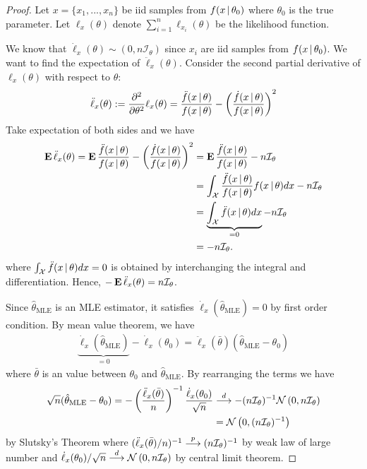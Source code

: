 \documentclass[11pt]{article}
\begin{document}
\begin{proof}
	Let $x=\{x_1,...,x_n\}$ be iid samples from $f(x\,|\,\theta_0)$ where
	$\theta_0$ is the true parameter.
	Let $\ell_{x}(\theta)$ denote $\sum_{i=1}^{n}\ell_{x_i}(\theta)$ be
	the likelihood function.

	We know that $\dot\ell_{x}(\theta)\sim(0,n\mathcal{I}_{\theta})$
	since $x_i$ are iid samples from $f(x\,|\,\theta_0)$.
	We want to find the expectation of $\ddot\ell_{x}(\theta)$.
	Consider the second partial derivative of $\ell_{x}(\theta)$
	with respect to $\theta$:
	\begin{align*}
		\ddot\ell_{x}(\theta)
		:= \frac{\partial^2}{\partial\theta^2} \ell_{x}(\theta)
		= \frac{\ddot f(x\,|\,\theta)}{f(x\,|\,\theta)}
		- \left(\frac{\dot f(x\,|\,\theta)}{f(x\,|\,\theta)}\right)^2
	\end{align*}
	Take expectation of both sides and we have
	\begin{align*}
		\operatorname{\text{\textrm{\upshape\textbf{E}}}}{\ddot\ell_{x}(\theta)}
		= \operatorname{\text{\textrm{\upshape\textbf{E}}}}{ \frac{\ddot f(x\,|\,\theta)}{f(x\,|\,\theta)}
		- \left(\frac{\dot f(x\,|\,\theta)}{f(x\,|\,\theta)}\right)^2 }
		&= \operatorname{\text{\textrm{\upshape\textbf{E}}}}{\frac{\ddot f(x\,|\,\theta)}{f(x\,|\,\theta)}}
		- n\mathcal{I}_{\theta} \\
		&= \int_{\mathcal{X}}
		\frac{\ddot f(x\,|\,\theta)}{f(x\,|\,\theta)}f(x\,|\,\theta) d{x}
		- n\mathcal{I}_{\theta} \\
		&= \underbrace{\int_{\mathcal{X}} \ddot f(x\,|\,\theta) d{x}}_{=0}
		- n\mathcal{I}_{\theta} \\
		&= - n\mathcal{I}_{\theta}.
	\end{align*}
	where $\int_{\mathcal{X}}\ddot f(x\,|\,\theta)d{x}=0$ is obtained by
	interchanging the integral and differentiation.
	Hence, $-\operatorname{\text{\textrm{\upshape\textbf{E}}}}{\ddot\ell_{x}(\theta)}=n\mathcal{I}_{\theta}$.

	Since $\hat{\theta}_{\text{MLE}}$ is an MLE estimator, 
	it satisfies $\dot\ell_{x}(\hat{\theta}_{\text{MLE}})=0$ by first order condition.
	By mean value theorem, we have
	\begin{align*}
		\underbrace{\dot\ell_{x}(\hat{\theta}_{\text{MLE}})}_{=0}
		- \dot\ell_{x}(\theta_0)
		= \ddot\ell_{x}(\bar\theta)(\hat{\theta}_{\text{MLE}}-\theta_0)
	\end{align*}
	where $\bar{\theta}$ is an value between $\theta_0$ and $\hat{\theta}_{\text{MLE}}$.
	By rearranging the terms we have
	\begin{align*}
		\sqrt{n}(\hat{\theta}_{\text{MLE}}-\theta_0)
		= -\left(\frac{\ddot\ell_{x}(\bar\theta)}{n}\right)^{-1}
		\frac{\dot\ell_{x}(\theta_0)}{\sqrt{n}}
		&\overset{d}{\longrightarrow} -(n\mathcal{I}_{\theta})^{-1}\mathcal{N}\left(0,n\mathcal{I}_{\theta}\right) \\
		&= \mathcal{N}\left(0,(n\mathcal{I}_{\theta})^{-1}\right)
	\end{align*}
	by Slutsky's Theorem
	where $({\ddot\ell_{x}(\bar\theta)}/{n})^{-1}\overset{p}{\longrightarrow}(n\mathcal{I}_{\theta})^{-1}$
	by weak law of large number and
	${\dot\ell_{x}(\theta_0)}/{\sqrt{n}}\overset{d}{\longrightarrow}\mathcal{N}\left(0,n\mathcal{I}_{\theta}\right)$
	by central limit theorem.
\end{proof}
\end{document}
